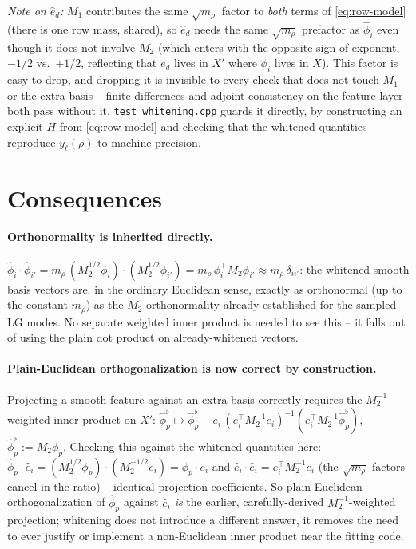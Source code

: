 \documentclass[11pt]{article}
\newcommand{\Mone}{M_1}
\newcommand{\Mtwo}{M_2}
\newcommand{\what}[1]{\widehat{#1}}
\begin{document}
\emph{Note on $\what e_d$:} $\Mone$ contributes the same $\sqrt{m_\rho}$
factor to \emph{both} terms of \eqref{eq:row-model} (there is one row mass,
shared), so $\what e_d$ needs the same $\sqrt{m_\rho}$ prefactor as $\what
\phi_i$ even though it does not involve $\Mtwo$ (which enters with the
opposite sign of exponent, $-1/2$ vs.\ $+1/2$, reflecting that $e_d$ lives in
$X'$ where $\phi_i$ lives in $X$). This factor is easy to drop, and dropping
it is invisible to every check that does not touch $\Mone$ or the extra basis
-- finite differences and adjoint consistency on the feature layer both pass
without it. \texttt{test\_whitening.cpp} guards it directly, by constructing an
explicit $H$ from \eqref{eq:row-model} and checking that the whitened
quantities reproduce $y_\ell(\rho)$ to machine precision.

\section{Consequences}

\paragraph{Orthonormality is inherited directly.} $\what\phi_i\cdot\what
\phi_{i'} = m_\rho\,(\Mtwo^{1/2}\phi_i)\cdot(\Mtwo^{1/2}\phi_{i'}) = m_\rho\,
\phi_i^\top \Mtwo \phi_{i'} \approx m_\rho\,\delta_{ii'}$: the whitened
smooth basis vectors are, in the ordinary Euclidean sense, exactly as
orthonormal (up to the constant $m_\rho$) as the $\Mtwo$-orthonormality
already established for the sampled LG modes. No separate weighted inner
product is needed to see this -- it falls out of using the plain dot product
on already-whitened vectors.

\paragraph{Plain-Euclidean orthogonalization is now correct by construction.}
Projecting a smooth feature against an extra basis correctly requires the
$\Mtwo^{-1}$-weighted inner
product on $X'$: $\what\phi_p^\flat \mapsto \what\phi_p^\flat -
e_i\,(e_i^\top \Mtwo^{-1} e_i)^{-1}(e_i^\top \Mtwo^{-1} \what\phi_p^\flat)$,
$\what\phi_p^\flat := \Mtwo\phi_p$. Checking this against the whitened
quantities here: $\what\phi_p \cdot \what e_i = (\Mtwo^{1/2}\phi_p)\cdot
(\Mtwo^{-1/2}e_i) = \phi_p \cdot e_i$ and $\what e_i \cdot \what e_i = e_i^\top
\Mtwo^{-1} e_i$ (the $\sqrt{m_\rho}$ factors cancel in the ratio) --
identical projection coefficients. So plain-Euclidean orthogonalization of
$\what\phi_p$ against $\what e_i$ \emph{is} the earlier, carefully-derived
$\Mtwo^{-1}$-weighted projection; whitening does not introduce a different
answer, it removes the need to ever justify or implement a non-Euclidean
inner product near the fitting code.
\end{document}
